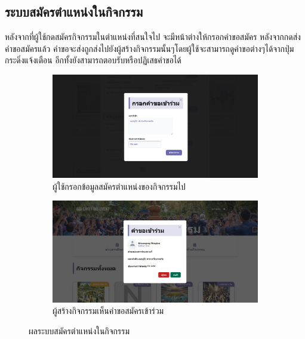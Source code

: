 \FloatBarrier

\subsection{ระบบสมัครตำแหน่งในกิจกรรม}
หลังจากที่ผู้ใช้กดสมัครกิจกรรมในตำแหน่งที่สนใจไป จะมีหน้าต่างให้กรอกคำขอสมัคร หลังจากกดส่งคำขอสมัครแล้ว คำขอจะส่งถูกส่งไปยังผู้สร้างกิจกรรมนั้นๆโดยผู้ใช้จะสามารถดูคำขอต่างๆได้จากปุ่มกระดิ่งแจ้งเตือน อีกทั้งยังสามารถตอบรับหรือปฏิเสธคำขอได้
\begin{figure}[h]
  \centering
  \begin{subfigure}[b]{0.4\linewidth}
    \includegraphics[width=\linewidth]{image/web/createReq.jpg}
    \caption{ผู้ใช้กรอกข้อมูลสมัครตำแหน่งของกิจกรรมไป}
  \end{subfigure}
  \hfill
  \begin{subfigure}[b]{0.4\linewidth}
    \includegraphics[width=\linewidth]{image/web/joinReq.jpg}
    \caption{ผู้สร้างกิจกรรมเห็นคำขอสมัครเข้าร่วม}
  \end{subfigure}
  \caption{ผลระบบสมัครตำแหน่งในกิจกรรม}
  \label{fig:joinReq}
\end{figure}

\FloatBarrier